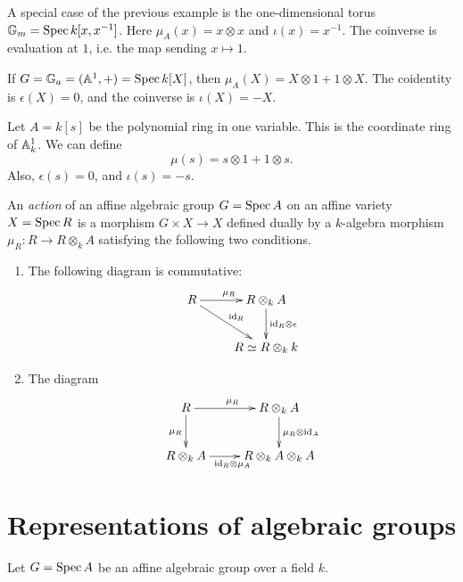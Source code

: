 \documentclass[11pt, english]{article}
\begin{document}
\begin{example}
A special case of the previous example is the one-dimensional torus $\mathbb{G}_m=\operatorname{Spec} k[x,x^{-1}]$. Here $\mu_A(x)=x \otimes x$ and $\iota(x)=x^{-1}$. The coinverse is evaluation at $1$, i.e. the map sending $x \mapsto 1$.
\end{example}

\begin{example}
If $G=\mathbb{G}_a=(\mathbb{A}^1,+)=\operatorname{Spec} k[X]$, then $\mu_A(X)=X \otimes 1 + 1 \otimes X$. The coidentity is $\epsilon(X)=0$, and the coinverse is $\iota(X)=-X$.
\end{example}

\begin{example}
 Let $A=k[s]$ be the polynomial ring in one variable. This is the coordinate ring of $\mathbb{A}_k^1$. We can define 
$$
\mu(s) = s \otimes 1 + 1 \otimes s.
$$
Also, $\epsilon(s)=0$, and $\iota(s)=-s$. 
\end{example}


\begin{defi}
\label{defaction}
An \emph{action} of an affine algebraic group $G = \operatorname{Spec} A$ on an affine variety $X= \operatorname{Spec} R$ is a morphism $G \times X \to X$ defined dually by a $k$-algebra morphism $\mu_R : R \to R \otimes_k A$ satisfying the following two conditions.
\begin{enumerate}
\item  The following diagram is commutative:
\[
\xymatrix{
R \ar[dr]^{\id_R} \ar[r]^{\mu_R} & R \otimes_k A \ar[d]^{\id_R \otimes \epsilon} \\
 & R \simeq R \otimes_k k
}
\]
\item The diagram
\[
\xymatrix{
R \ar[r]^{\mu_R} \ar[d]_{\mu_R} & R \otimes_k A \ar[d]^{\mu_R \otimes \id_A} \\
R \otimes_k A \ar[r]_{\id_R \otimes \mu_A} & R \otimes _k A \otimes_k A
}
\]
\end{enumerate}
\end{defi}


\section{Representations of algebraic groups}

Let $G = \operatorname{Spec} A$ be an affine algebraic group over a field $k$. 
\end{document}

